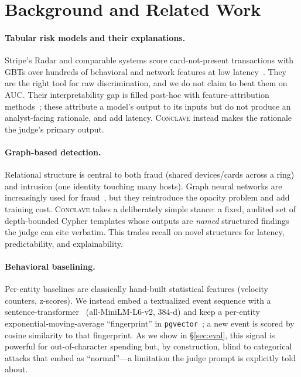 \documentclass[sigconf,nonacm,screen]{acmart}
\begin{document}
\section{Background and Related Work}

\paragraph{Tabular risk models and their explanations.}
Stripe's Radar and comparable systems score card-not-present transactions with
GBTs over hundreds of behavioral and network features at low
latency~\cite{stripe_radar,chen2018xgboost}. They are the right tool for raw
discrimination, and we do not claim to beat them on AUC. Their interpretability
gap is filled post-hoc with feature-attribution methods~\cite{lundberg2017shap,
ribeiro2016lime}; these attribute a model's output to its inputs but do not
produce an analyst-facing rationale, and add latency. \textsc{Conclave} instead
makes the rationale the judge's primary output.

\paragraph{Graph-based detection.}
Relational structure is central to both fraud (shared devices/cards across a
ring) and intrusion (one identity touching many hosts). Graph neural networks
are increasingly used for fraud~\cite{shi2024graphfraud}, but they reintroduce
the opacity problem and add training cost. \textsc{Conclave} takes a
deliberately simple stance: a fixed, audited set of depth-bounded Cypher
templates whose outputs are \emph{named} structured findings the judge can cite
verbatim. This trades recall on novel structures for latency, predictability, and
explainability.

\paragraph{Behavioral baselining.}
Per-entity baselines are classically hand-built statistical features (velocity
counters, z-scores). We instead embed a textualized event sequence with a
sentence-transformer~\cite{reimers2019sbert} (all-MiniLM-L6-v2, 384-d) and keep a
per-entity exponential-moving-average ``fingerprint'' in
\texttt{pgvector}~\cite{pgvector}; a new event is scored by cosine similarity to
that fingerprint. As we show in \S\ref{sec:eval}, this signal is powerful for
out-of-character spending but, by construction, blind to categorical attacks that
embed as ``normal''---a limitation the judge prompt is explicitly told about.
\end{document}
